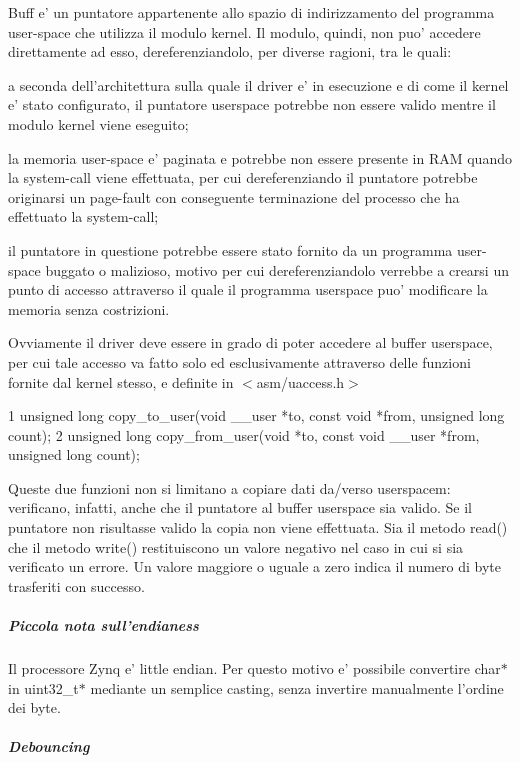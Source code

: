 Buff e' un puntatore appartenente allo spazio di indirizzamento del programma user-\/space che utilizza il modulo kernel. Il modulo, quindi, non puo' accedere direttamente ad esso, dereferenziandolo, per diverse ragioni, tra le quali\+:
\begin{DoxyItemize}
\item a seconda dell'architettura sulla quale il driver e' in esecuzione e di come il kernel e' stato configurato, il puntatore userspace potrebbe non essere valido mentre il modulo kernel viene eseguito;
\item la memoria user-\/space e' paginata e potrebbe non essere presente in R\+A\+M quando la system-\/call viene effettuata, per cui dereferenziando il puntatore potrebbe originarsi un page-\/fault con conseguente terminazione del processo che ha effettuato la system-\/call;
\item il puntatore in questione potrebbe essere stato fornito da un programma user-\/space buggato o malizioso, motivo per cui dereferenziandolo verrebbe a crearsi un punto di accesso attraverso il quale il programma userspace puo' modificare la memoria senza costrizioni.
\end{DoxyItemize}

Ovviamente il driver deve essere in grado di poter accedere al buffer userspace, per cui tale accesso va fatto solo ed esclusivamente attraverso delle funzioni fornite dal kernel stesso, e definite in $<$asm/uaccess.\+h$>$ 
\begin{DoxyCode}
1 unsigned long copy\_to\_user(void \_\_user *to, const void *from, unsigned long count);
2 unsigned long copy\_from\_user(void *to, const void \_\_user *from, unsigned long count);
\end{DoxyCode}
 Queste due funzioni non si limitano a copiare dati da/verso userspacem\+: verificano, infatti, anche che il puntatore al buffer userspace sia valido. Se il puntatore non risultasse valido la copia non viene effettuata. Sia il metodo read() che il metodo write() restituiscono un valore negativo nel caso in cui si sia verificato un errore. Un valore maggiore o uguale a zero indica il numero di byte trasferiti con successo.

\subparagraph*{Piccola nota sull'endianess}

Il processore Zynq e' little endian. Per questo motivo e' possibile convertire char$\ast$ in uint32\+\_\+t$\ast$ mediante un semplice casting, senza invertire manualmente l'ordine dei byte.

\subparagraph*{Debouncing}

